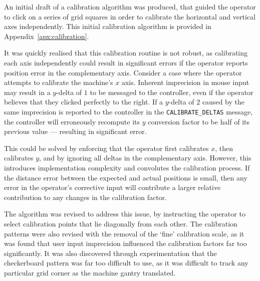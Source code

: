 \documentclass[12pt,british,UKenglish]{article}
\begin{document}
An initial draft of a calibration algorithm was produced, that guided the operator to click on a series of grid squares in order to calibrate the horizontal and vertical axes independently.
This initial calibration algorithm is provided in Appendix~\ref{apx:calibration}.

It was quickly realised that this calibration routine is not robust, as calibrating each axis independently could result in significant errors if the operator reports position error in the complementary axis.
Consider a case where the operator attempts to calibrate the machine's $x$ axis.
Inherent imprecision in mouse input may result in a $y$-delta of $1$ to be messaged to the controller, even if the operator believes that they clicked perfectly to the right.
If a $y$-delta of $2$ caused by the same imprecision is reported to the controller in the \texttt{CALIBRATE\_DELTAS} message, the controller will erroneously recompute its $y$ conversion factor to be half of its previous value --- resulting in significant error.

This could be solved by enforcing that the operator first calibrates $x$, then calibrates $y$, and by ignoring all deltas in the complementary axis.
However, this introduces implementation complexity and convolutes the calibration process.
If the distance error between the expected and actual positions is small, then any error in the operator's corrective input will contribute a larger relative contribution to any changes in the calibration factor.

The algorithm was revised to address this issue, by instructing the operator to select calibration points that lie diagonally from each other.
The calibration patterns were also revised with the removal of the `fine' calibration scale, as it was found that user input imprecision influenced the calibration factors far too significantly.
It was also discovered through experimentation that the checkerboard pattern was far too difficult to use, as it was difficult to track any particular grid corner as the machine gantry translated.
\end{document}
